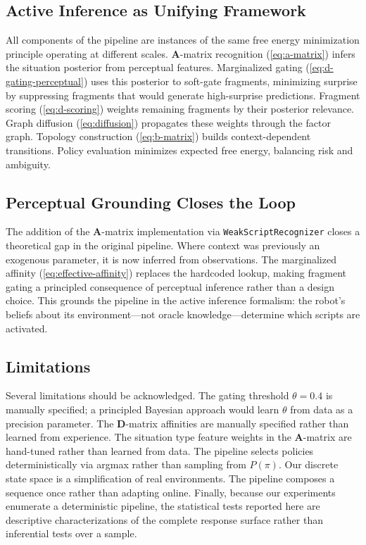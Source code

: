 \documentclass[11pt,a4paper]{article}
\newcommand{\A}{\mathbf{A}}
\newcommand{\D}{\mathbf{D}}
\begin{document}
\subsection{Active Inference as Unifying Framework}

All components of the pipeline are instances of the same free energy minimization principle operating at different scales.  $\A$-matrix recognition (\cref{eq:a-matrix}) infers the situation posterior from perceptual features.  Marginalized gating (\cref{eq:d-gating-perceptual}) uses this posterior to soft-gate fragments, minimizing surprise by suppressing fragments that would generate high-surprise predictions.  Fragment scoring (\cref{eq:d-scoring}) weights remaining fragments by their posterior relevance.  Graph diffusion (\cref{eq:diffusion}) propagates these weights through the factor graph.  Topology construction (\cref{eq:b-matrix}) builds context-dependent transitions.  Policy evaluation minimizes expected free energy, balancing risk and ambiguity.

\subsection{Perceptual Grounding Closes the Loop}

The addition of the $\A$-matrix implementation via \texttt{WeakScriptRecognizer} closes a theoretical gap in the original pipeline.  Where context was previously an exogenous parameter, it is now inferred from observations.  The marginalized affinity (\cref{eq:effective-affinity}) replaces the hardcoded lookup, making fragment gating a principled consequence of perceptual inference rather than a design choice.  This grounds the pipeline in the active inference formalism: the robot's beliefs about its environment---not oracle knowledge---determine which scripts are activated.

\subsection{Limitations}

Several limitations should be acknowledged.  The gating threshold $\theta = 0.4$ is manually specified; a principled Bayesian approach would learn $\theta$ from data as a precision parameter.  The $\D$-matrix affinities are manually specified rather than learned from experience.  The situation type feature weights in the $\A$-matrix are hand-tuned rather than learned from data.  The pipeline selects policies deterministically via argmax rather than sampling from $P(\pi)$.  Our discrete state space is a simplification of real environments.  The pipeline composes a sequence once rather than adapting online.  Finally, because our experiments enumerate a deterministic pipeline, the statistical tests reported here are descriptive characterizations of the complete response surface rather than inferential tests over a sample.
\end{document}
